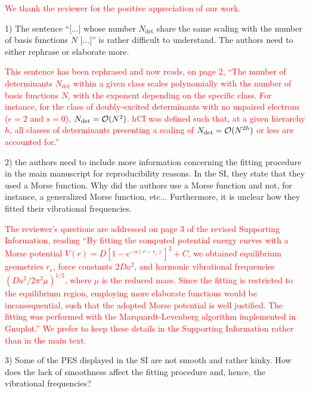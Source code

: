\documentclass[10pt]{letter}
\newcommand{\alert}[1]{\textcolor{red}{#1}}
\newcommand{\Ndet}{N_\text{det}}
\begin{document}
\begin{letter}
\alert{
We thank the reviewer for the positive appreciation of our work.
}

{1) The sentence ``[...] whose number $\Ndet$ share the same scaling with the number of basis functions $N$ [...]'' is rather difficult to understand. The authors need to either rephrase or elaborate more.
}

\alert{
This sentence has been rephrased and now reads, on page 2,
``The number of determinants $\Ndet$ within a given class scales polynomially with the number of basis functions $N$, with the exponent depending on the specific class.
For instance, for the class of doubly-excited determinants with no unpaired electrons ($e=2$ and $s=0$), $\Ndet = \order*{N^2}$.
hCI was defined such that, at a given hierarchy $h$, all classes of determinants presenting a scaling of $\Ndet = \order*{N^{2h}}$ or less are accounted for.''
}

{2) the authors need to include more information concerning the fitting procedure in the main manuscript for reproducibility reasons. In the SI, they state that they used a Morse function. Why did the authors use a Morse function and not, for instance, a generalized Morse function, etc... Furthermore, it is unclear how they fitted their vibrational frequencies.
}

\alert{
The reviewer's questions are addressed on page 3 of the revised Supporting Information, reading
``By fitting the computed potential energy curves with a Morse potential $V(r) = D [1 - e^{-a(r-r_e)}]^2 + C $,
we obtained equilibrium geometries $r_e$, force constants $2Da^2$, and harmonic vibrational frequencies $\left( Da^2/2\pi^2\mu \right)^{1/2}$,
where $\mu$ is the reduced mass.
Since the fitting is restricted to the equilibrium region, employing more elaborate functions would be inconsequential, such that the adopted Morse potential is well justified.
The fitting was performed with the Marquardt-Levenberg algorithm implemented in Gnuplot.''
We prefer to keep these details in the Supporting Information rather than in the main text.
}

{3) Some of the PES displayed in the SI are not smooth and rather kinky. How does the lack of smoothness affect the fitting procedure and, hence, the vibrational frequencies?
}


\end{letter}
\end{document}
